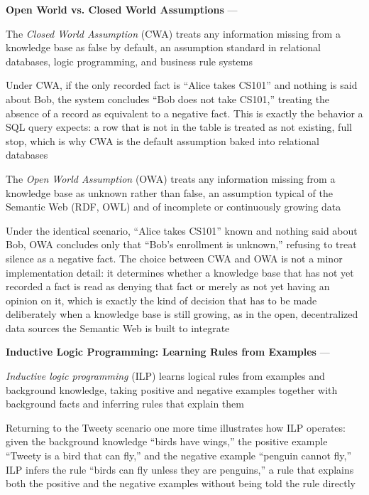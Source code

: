 \textbf{Open World vs. Closed World Assumptions} --- \begin{definition}
  The \emph{Closed World Assumption} (CWA) treats any information missing
  from a knowledge base as false by default, an assumption standard in
  relational databases, logic programming, and business rule systems
\end{definition}
Under CWA, if the only recorded fact is ``Alice takes CS101'' and nothing
is said about Bob, the system concludes ``Bob does not take CS101,''
treating the absence of a record as equivalent to a negative fact. This is
exactly the behavior a SQL query expects: a row that is not in the table is
treated as not existing, full stop, which is why CWA is the default
assumption baked into relational databases

\begin{definition}
  The \emph{Open World Assumption} (OWA) treats any information missing
  from a knowledge base as unknown rather than false, an assumption typical
  of the Semantic Web (RDF, OWL) and of incomplete or continuously growing
  data
\end{definition}
Under the identical scenario, ``Alice takes CS101'' known and nothing said
about Bob, OWA concludes only that ``Bob's enrollment is unknown,'' refusing
to treat silence as a negative fact. The choice between CWA and OWA is not
a minor implementation detail: it determines whether a knowledge base that
has not yet recorded a fact is read as denying that fact or merely as not
yet having an opinion on it, which is exactly the kind of decision that has
to be made deliberately when a knowledge base is still growing, as in the
open, decentralized data sources the Semantic Web is built to integrate

\textbf{Inductive Logic Programming: Learning Rules from Examples} ---
\begin{definition}
  \emph{Inductive logic programming} (ILP) learns logical rules from
  examples and background knowledge, taking positive and negative examples
  together with background facts and inferring rules that explain them
\end{definition}
Returning to the Tweety scenario one more time illustrates how ILP
operates: given the background knowledge ``birds have wings,'' the positive
example ``Tweety is a bird that can fly,'' and the negative example
``penguin cannot fly,'' ILP infers the rule ``birds can fly unless they are
penguins,'' a rule that explains both the positive and the negative
examples without being told the rule directly

